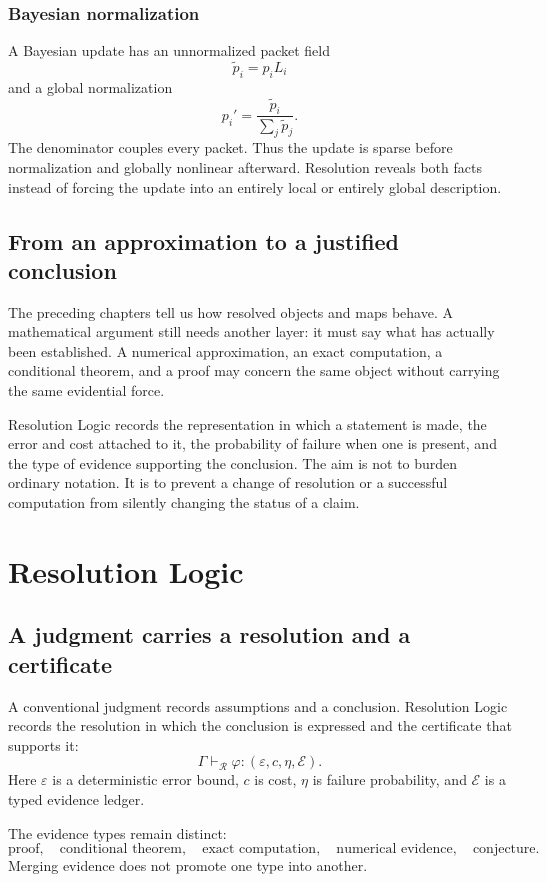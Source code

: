 \documentclass[11pt,oneside]{book}
\theoremstyle{remark}
\begin{document}
\subsection{Bayesian normalization}
A Bayesian update has an unnormalized packet field
\[
\widetilde p_i=p_iL_i
\]
and a global normalization
\[
p_i'=\frac{\widetilde p_i}{\sum_j\widetilde p_j}.
\]
The denominator couples every packet.  Thus the update is sparse before normalization and globally nonlinear afterward.  Resolution reveals both facts instead of forcing the update into an entirely local or entirely global description.

\section*{From an approximation to a justified conclusion}
The preceding chapters tell us how resolved objects and maps behave.  A mathematical argument still needs another layer: it must say what has actually been established.  A numerical approximation, an exact computation, a conditional theorem, and a proof may concern the same object without carrying the same evidential force.

Resolution Logic records the representation in which a statement is made, the error and cost attached to it, the probability of failure when one is present, and the type of evidence supporting the conclusion.  The aim is not to burden ordinary notation.  It is to prevent a change of resolution or a successful computation from silently changing the status of a claim.

\chapter{Resolution Logic}

\section{A judgment carries a resolution and a certificate}
A conventional judgment records assumptions and a conclusion.  Resolution Logic records the resolution in which the conclusion is expressed and the certificate that supports it:
\[
\boxed{
\Gamma\vdash_\mathcal R\varphi:(\varepsilon,c,\eta,\mathcal E).
}
\]
Here \(\varepsilon\) is a deterministic error bound, \(c\) is cost, \(\eta\) is failure probability, and \(\mathcal E\) is a typed evidence ledger.

The evidence types remain distinct:
\[
\text{proof},\quad
\text{conditional theorem},\quad
\text{exact computation},\quad
\text{numerical evidence},\quad
\text{conjecture}.
\]
Merging evidence does not promote one type into another.
\end{document}
